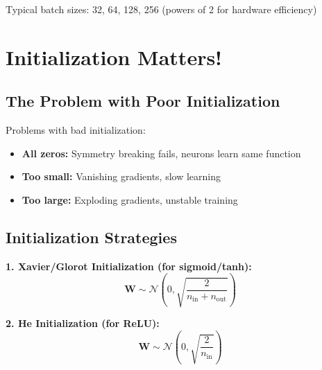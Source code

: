 \documentclass{article}
\begin{document}
Typical batch sizes: 32, 64, 128, 256 (powers of 2 for hardware efficiency)

\section{Initialization Matters!}

\subsection{The Problem with Poor Initialization}

\begin{center}
\end{center}

Problems with bad initialization:
\begin{itemize}
\item \textbf{All zeros:} Symmetry breaking fails, neurons learn same function
\item \textbf{Too small:} Vanishing gradients, slow learning
\item \textbf{Too large:} Exploding gradients, unstable training
\end{itemize}

\subsection{Initialization Strategies}

\textbf{1. Xavier/Glorot Initialization (for sigmoid/tanh):}
$$\mathbf{W} \sim \mathcal{N}\left(0, \sqrt{\frac{2}{n_{\text{in}} + n_{\text{out}}}}\right)$$

\textbf{2. He Initialization (for ReLU):}
$$\mathbf{W} \sim \mathcal{N}\left(0, \sqrt{\frac{2}{n_{\text{in}}}}\right)$$
\end{document}
